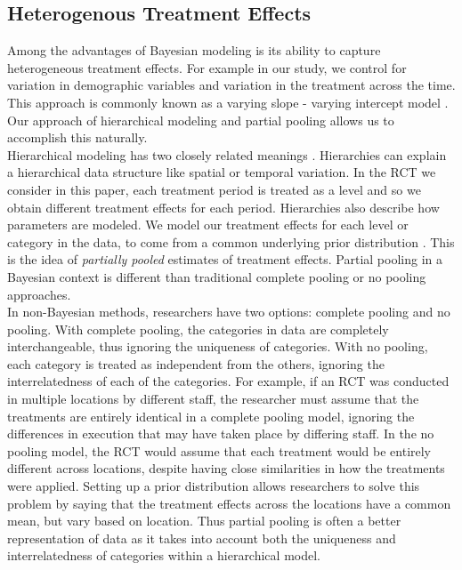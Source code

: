 \documentclass{article}
\begin{document}
\subsection{Heterogenous Treatment Effects}
Among the advantages of Bayesian modeling is its ability to capture heterogeneous treatment effects. For example in our study, we control for variation in demographic variables and variation in the treatment across the time. This approach is commonly known as a varying slope - varying intercept model \cite{gelman2006data}. Our approach of hierarchical modeling and partial pooling allows us to accomplish this naturally. \\
Hierarchical modeling has two closely related meanings \cite{feller2015hierarchical}. Hierarchies can explain a hierarchical data structure like spatial or temporal variation. In the RCT we consider in this paper, each treatment period is treated as a level and so we obtain different treatment effects for each period. Hierarchies also describe how parameters are modeled. We model our treatment effects for each level or category in the data, to come from a common underlying prior distribution \cite{gelman2014bayesian}. This is the idea of \textit{partially pooled} estimates of treatment effects. Partial pooling in a Bayesian context is different than traditional complete pooling or no pooling approaches. \\
In non-Bayesian methods, researchers have two options: complete pooling and no pooling. With complete pooling, the categories in data are completely interchangeable, thus ignoring the uniqueness of categories. With no pooling, each category is treated as independent from the others, ignoring the interrelatedness of each of the categories.  For example, if an RCT was conducted in multiple locations by different staff, the researcher must assume that the treatments are entirely identical in a complete pooling model, ignoring the differences in execution that may have taken place by differing staff. In the no pooling model, the RCT would assume that each treatment would be entirely different across locations, despite having close similarities in how the treatments were applied. Setting up a prior distribution allows researchers to solve this problem by saying that the treatment effects across the locations have a common mean, but vary based on location. Thus partial pooling is often a better representation of data as it takes into account both the uniqueness and interrelatedness of categories within a hierarchical model.
\end{document}
